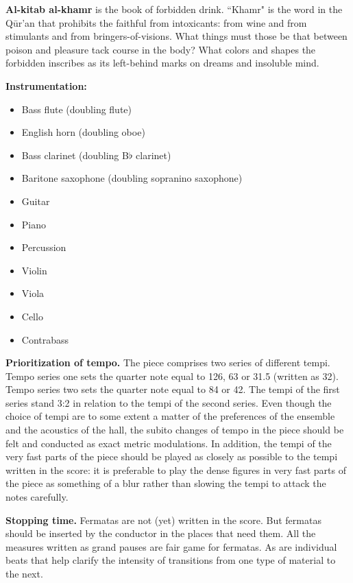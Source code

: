 \textbf{Al-kitab al-khamr} is the book of forbidden drink. ``Khamr" is the word
in the Q\={u}r'an that prohibits the faithful from intoxicants: from wine and
from stimulants and from bringers-of-visions. What things must those be that
between poison and pleasure tack course in the body? What colors and shapes the
forbidden inscribes as its left-behind marks on dreams and insoluble mind.

\textbf{Instrumentation:}

\begin{itemize} \itemsep2pt
\item Bass flute (doubling flute)
\item English horn (doubling oboe)
\item Bass clarinet (doubling B$\flat$ clarinet)
\item Baritone saxophone (doubling sopranino saxophone)
\item Guitar
\item Piano
\item Percussion
\item Violin
\item Viola
\item Cello
\item Contrabass
\end{itemize}

\textbf{Prioritization of tempo.} The piece comprises two series of different
tempi. Tempo series one sets the quarter note equal to 126, 63 or 31.5 (written
as 32). Tempo series two sets the quarter note equal to 84 or 42. The tempi of
the first series stand 3:2 in relation to the tempi of the second series.
Even though the choice of tempi are to some extent a matter of the preferences
of the ensemble and the acoustics of the hall, the subito changes of tempo in
the piece should be felt and conducted as exact metric modulations. In
addition, the tempi of the very fast parts of the piece should be played as
closely as possible to the tempi written in the score: it is preferable to play
the dense figures in very fast parts of the piece as something of a blur rather
than slowing the tempi to attack the notes carefully.

\textbf{Stopping time.} Fermatas are not (yet) written in the score. But
fermatas should be inserted by the conductor in the places that need them. All
the measures written as grand pauses are fair game for fermatas. As are
individual beats that help clarify the intensity of transitions from one type
of material to the next.

